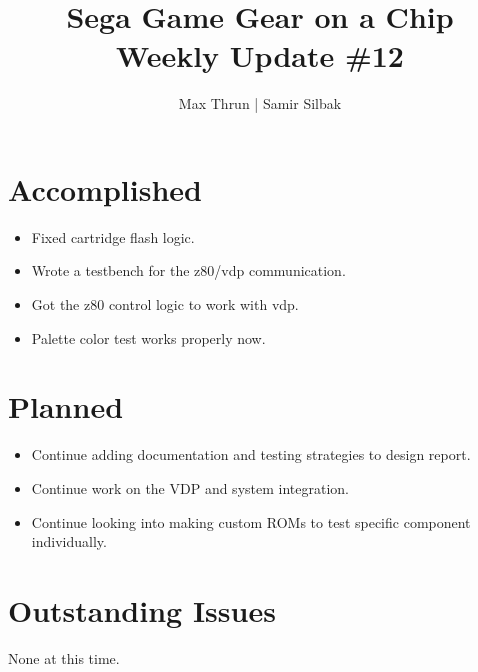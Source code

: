 \documentclass[12pt]{article}
\title{Sega Game Gear on a Chip \\ Weekly Update \#12}
\author{ Max Thrun | Samir Silbak }
\begin{document}
\maketitle

\section*{Accomplished}
\begin{itemize}
    \item Fixed cartridge flash logic.
    \item Wrote a testbench for the z80/vdp communication.
    \item Got the z80 control logic to work with vdp.
    \item Palette color test works properly now.
\end{itemize}

\section*{Planned}
\begin{itemize}
    \item Continue adding documentation and testing strategies to design report.
    \item Continue work on the VDP and system integration.
    \item Continue looking into making custom ROMs to test specific component individually.
\end{itemize}

\section*{Outstanding Issues}
None at this time.

\vspace{.1in}
\end{document}

